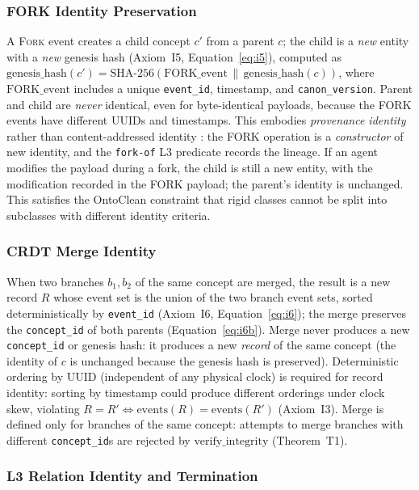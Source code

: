 \subsubsection{FORK Identity Preservation}\label{subsubsec:fork-identity}

A \textsc{Fork} event creates a child concept $c'$ from a parent $c$; the child is a \emph{new} entity with a \emph{new} genesis hash (Axiom~I5, Equation~\ref{eq:i5}), computed as $\text{genesis\_hash}(c') = \text{SHA-256}(\text{FORK\_event} \,\|\, \text{genesis\_hash}(c))$, where $\text{FORK\_event}$ includes a unique \texttt{event\_id}, timestamp, and \texttt{canon\_version}. Parent and child are \emph{never} identical, even for byte-identical payloads, because the FORK events have different UUIDs and timestamps. This embodies \emph{provenance identity} rather than content-addressed identity \cite{trusty_uris}: the FORK operation is a \emph{constructor} of new identity, and the \texttt{fork-of} L3 predicate records the lineage. If an agent modifies the payload during a fork, the child is still a new entity, with the modification recorded in the FORK payload; the parent's identity is unchanged. This satisfies the OntoClean constraint that rigid classes cannot be split into subclasses with different identity criteria.

\subsubsection{CRDT Merge Identity}\label{subsubsec:crdt-merge-identity}

When two branches $b_1, b_2$ of the same concept are merged, the result is a new record $R$ whose event set is the union of the two branch event sets, sorted deterministically by \texttt{event\_id} (Axiom~I6, Equation~\ref{eq:i6}); the merge preserves the \texttt{concept\_id} of both parents (Equation~\ref{eq:i6b}). Merge never produces a new \texttt{concept\_id} or genesis hash: it produces a new \emph{record} of the same concept (the identity of $c$ is unchanged because the genesis hash is preserved). Deterministic ordering by UUID (independent of any physical clock) is required for record identity: sorting by timestamp could produce different orderings under clock skew, violating $R = R' \iff \text{events}(R) = \text{events}(R')$ (Axiom~I3). Merge is defined only for branches of the same concept: attempts to merge branches with different \texttt{concept\_id}s are rejected by $\text{verify\_integrity}$ (Theorem~T1).

\subsubsection{L3 Relation Identity and Termination}\label{subsubsec:l3-relation-identity}

